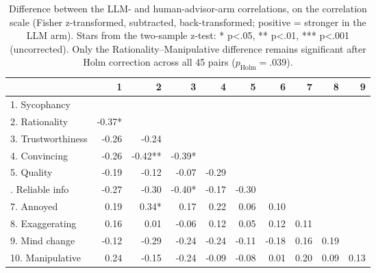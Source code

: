 \begin{table}

\caption{\label{tab:cor_diff}Difference between the LLM- and human-advisor-arm correlations, on the correlation scale (Fisher z-transformed, subtracted, back-transformed; positive = stronger in the LLM arm). Stars from the two-sample z-test: * p<.05, ** p<.01, *** p<.001 (uncorrected). Only the Rationality--Manipulative difference remains significant after Holm correction across all 45 pairs ($p_{\mathrm{Holm}} = .039$).}
\centering
\begin{tabular}[t]{lrrrrrrrrr}
\toprule
  & 1 & 2 & 3 & 4 & 5 & 6 & 7 & 8 & 9\\
\midrule
1. Sycophancy &  &  &  &  &  &  &  &  & \\
2. Rationality & -0.37* &  &  &  &  &  &  &  & \\
3. Trustworthiness & -0.26 & -0.24 &  &  &  &  &  &  & \\
4. Convincing & -0.26 & -0.42** & -0.39* &  &  &  &  &  & \\
5. Quality & -0.19 & -0.12 & -0.07 & -0.29 &  &  &  &  & \\
\addlinespace
6. Reliable info & -0.27 & -0.30 & -0.40* & -0.17 & -0.30 &  &  &  & \\
7. Annoyed & 0.19 & 0.34* & 0.17 & 0.22 & 0.06 & 0.10 &  &  & \\
8. Exaggerating & 0.16 & 0.01 & -0.06 & 0.12 & 0.05 & 0.12 & 0.11 &  & \\
9. Mind change & -0.12 & -0.29 & -0.24 & -0.24 & -0.11 & -0.18 & 0.16 & 0.19 & \\
10. Manipulative & 0.24 & -0.15 & -0.24 & -0.09 & -0.08 & 0.01 & 0.20 & 0.09 & 0.13\\
\bottomrule
\end{tabular}
\end{table}

